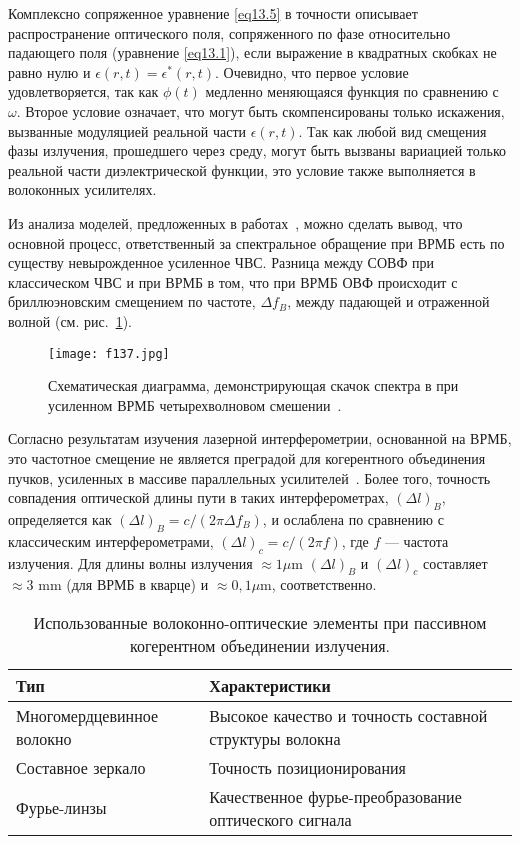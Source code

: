 Комплексно сопряженное уравнение \eqref{eq13.5} в точности описывает
распространение оптического поля, сопряженного по фазе относительно
падающего поля (уравнение \eqref{eq13.1}), если выражение в
квадратных скобках не равно нулю и $\epsilon(r,t) =
\epsilon^{\ast}(r,t)$. Очевидно, что первое условие удовлетворяется,
так как $\phi(t)$ медленно меняющаяся функция по сравнению с
$\omega$. Второе условие означает, что могут быть скомпенсированы
только искажения, вызванные модуляцией реальной части
$\epsilon(r,t)$. Так как любой вид смещения фазы излучения,
прошедшего через среду, могут быть вызваны вариацией только реальной
части диэлектрической функции, это условие также выполняется в
волоконных усилителях.

Из анализа моделей, предложенных в работах~\cite{1338,1339}, можно
сделать вывод, что основной процесс, ответственный за спектральное
обращение при ВРМБ есть по существу невырожденное усиленное ЧВС.
Разница между СОВФ при классическом ЧВС и при ВРМБ в том, что при
ВРМБ ОВФ происходит с бриллюэновским смещением по частоте, $\Delta
f_B$, между падающей и отраженной волной (см. рис.~\ref{f13.7}).


\begin{figure}
\centering
\texttt{[image: f137.jpg]}\\
\caption{Схематическая диаграмма, демонстрирующая скачок спектра в
при усиленном ВРМБ четырехволновом смешении~\cite{1300}.}
\label{f13.7}
\end{figure}


Согласно результатам изучения лазерной интерферометрии, основанной
на ВРМБ, это частотное смещение не является преградой для
когерентного объединения пучков, усиленных в массиве параллельных
усилителей~\cite{1338}. Более того, точность совпадения оптической
длины пути в таких интерферометрах, $(\Delta l)_B$, определяется как
$(\Delta l)_B = c/(2 \pi \Delta f_B)$, и ослаблена по сравнению с
классическим интерферометрами, $(\Delta l)_c = c/(2 \pi f)$, где $f$
--- частота излучения. Для длины волны излучения $\approx1 \mu$m
$(\Delta l)_B$ и $(\Delta l)_c$ составляет $\approx3$ mm (для ВРМБ в
кварце) и $\approx0{,}1 \mu$m, соответственно.


\begin{table} [htbp]
  \centering
  \parbox{16cm}{\caption{{Использованные волоконно-оптические элементы при пассивном когерентном объединении излучения.}}
  \label{tbl_nrl_6}}
  \begin{center}
  \begin{tabular}{ | p{6cm} | p{9cm} |}
  \hline
  \hline
  Тип & Характеристики \\
  \hline
  \hline
    Многомердцевинное волокно & Высокое качество и точность составной структуры волокна \\
  \hline
    Составное зеркало &  Точность позиционирования\\
  \hline
    Фурье-линзы &  Качественное фурье-преобразование оптического сигнала \\
  \hline
  \end{tabular}
\end{center}
\end{table}


